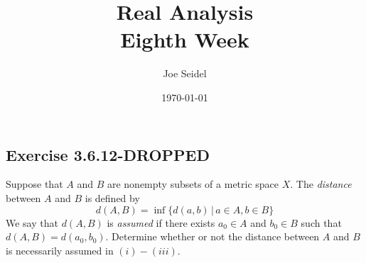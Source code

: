 \documentclass{tufte-book}
\title{Real Analysis\\Eighth Week }
\author{Joe Seidel}
\date{\today}
\theoremstyle{mytheoremstyle}
\theoremstyle{mylemstyle}
\theoremstyle{mydefstyle}
\begin{document}
\maketitle
{}
\newpage
{}

\subsection{Exercise 3.6.12-DROPPED}
Suppose that $A$ and $B$ are nonempty subsets of a metric space $X$.  The \textit{distance} between $A$ and $B$ is defined by
\[d(A,B) = \inf\{d(a,b) \,|\, a \in A, b \in B\} \]
We say that $d(A,B)$ is \textit{assumed} if there exists $a_0 \in A$ and $b_0 \in B$ such that $d(A,B) = d(a_0, b_0)$. Determine whether or not the distance between $A$ and $B$ is necessarily assumed in $(i)-(iii)$.
\end{document}
